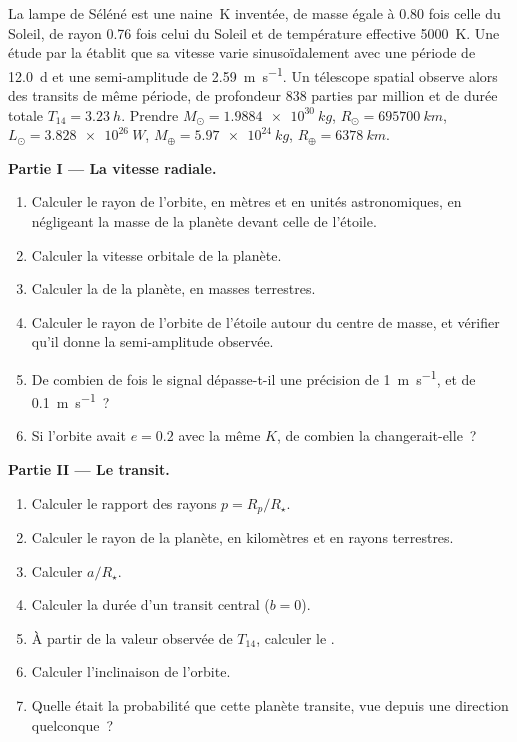 \begin{problem}
\label{pb:b3:exoplanets:1}
La lampe de Séléné est une naine~K inventée, de masse égale à 0.80 fois celle du Soleil, de rayon
0.76 fois celui du Soleil et de température effective \qty{5000}{K}. Une
étude par la  établit que sa vitesse varie sinusoïdalement avec
une période de \qty{12.0}{d} et une semi-amplitude de \qty{2.59}{m.s^{-1}}. Un
télescope spatial observe alors des transits de même période, de profondeur
\num{838} parties par million et de durée totale $T_{14} = \qty{3.23}{h}$.
Prendre $M_\odot = \qty{1.9884e30}{kg}$, $R_\odot = \qty{695700}{km}$,
$L_\odot = \qty{3.828e26}{W}$, $M_\oplus = \qty{5.97e24}{kg}$,
$R_\oplus = \qty{6378}{km}$.

\medskip\noindent\textbf{Partie I --- La vitesse radiale.}
\begin{enumerate}
\item Calculer le rayon de l'orbite, en mètres et en unités
  astronomiques, en négligeant la masse de la planète devant celle de l'étoile.
\item Calculer la vitesse orbitale de la planète.
\item Calculer la  de la planète, en masses terrestres.
\item Calculer le rayon de l'orbite de l'étoile autour du centre de
  masse, et vérifier qu'il donne la semi-amplitude observée.
\item De combien de fois le signal dépasse-t-il une précision de
  \qty{1}{m.s^{-1}}, et de \qty{0.1}{m.s^{-1}}~?
\item Si l'orbite avait $e = 0.2$ avec la même $K$, de combien la
   changerait-elle~?
\end{enumerate}

\medskip\noindent\textbf{Partie II --- Le transit.}
\begin{enumerate}[resume]
\item Calculer le rapport des rayons $p = R_p/R_\star$.
\item Calculer le rayon de la planète, en kilomètres et en rayons terrestres.
\item Calculer $a/R_\star$.
\item Calculer la durée d'un transit central ($b = 0$).
\item À partir de la valeur observée de $T_{14}$, calculer le .
\item Calculer l'inclinaison de l'orbite.
\item Quelle était la probabilité que cette planète transite, vue depuis une
  direction quelconque~?
\end{enumerate}


\end{problem}
